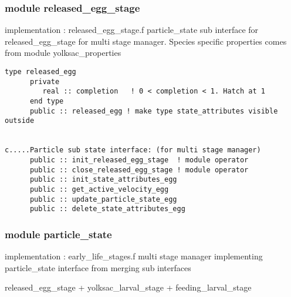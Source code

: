 \subsubsection{module released\_egg\_stage}                        
implementation : released\_egg\_stage.f
particle\_state sub interface for released\_egg\_stage for
multi stage manager. Species specific properties comes from 
module yolksac\_properties     


\begin{verbatim}
type released_egg
      private
         real :: completion   ! 0 < completion < 1. Hatch at 1
      end type
      public :: released_egg ! make type state_attributes visible outside


c.....Particle sub state interface: (for multi stage manager)
      public :: init_released_egg_stage  ! module operator
      public :: close_released_egg_stage ! module operator
      public :: init_state_attributes_egg
      public :: get_active_velocity_egg
      public :: update_particle_state_egg
      public :: delete_state_attributes_egg

\end{verbatim}

\subsubsection{module particle\_state}                             
implementation : early\_life\_stages.f
multi stage manager implementing particle\_state interface 
from merging sub interfaces

released\_egg\_stage + yolksac\_larval\_stage + feeding\_larval\_stage  




